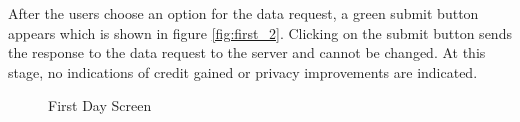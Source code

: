 After the users choose an option for the data request, a green submit button appears which is shown in figure \ref{fig:first_2}. Clicking on the submit button sends the response to the data request to the server and cannot be changed. At this stage, no indications of credit gained or privacy improvements are indicated.

\begin{figure}[htp]
  \hspace{3em}
  \caption{First Day Screen}
  \label{fig:first}
\end{figure}


